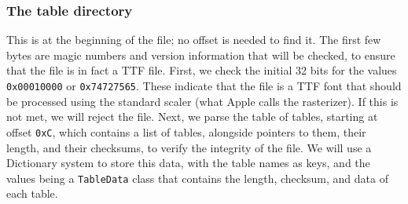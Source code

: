 \documentclass{report}
\begin{document}
\subsubsection{The table directory}
This is at the beginning of the file; no offset is needed to find it. The first
few bytes are magic numbers and version information that will be checked, to
ensure that the file is in fact a TTF file. First, we check the initial 32 bits
for the values \texttt{0x00010000} or \texttt{0x74727565}. These indicate that
the file is a TTF font that should be processed using the standard scaler (what
Apple calls the rasterizer). If this is not met, we will reject the file. Next,
we parse the table of tables, starting at offset \texttt{0xC}, which contains a
list of tables, alongside pointers to them, their length, and their checksums,
to verify the integrity of the file. We will use a Dictionary system to store
this data, with the table names as keys, and the values being a
\texttt{TableData} class that contains the length, checksum, and data of each
table.
\end{document}
